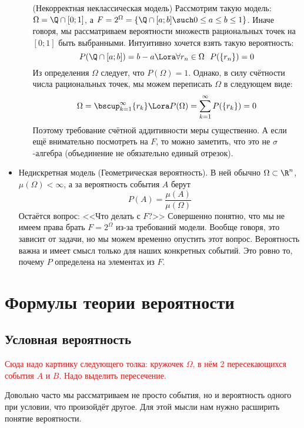 \begin{itemize}
\begin{enumerate}
		\begin{example} (Некорректная неклассическая модель)
			Рассмотрим такую модель: $\Omega = \Q \cap [0; 1]$, а $F = 2^\Omega = \{\Q \cap [a; b] \such 0 \le a \le b \le 1\}$. Иначе говоря, мы рассматриваем вероятности множеств рациональных точек на $[0; 1]$ быть выбранными. Интуитивно хочется взять такую вероятность:
			\[
				P(\Q \cap [a; b]) = b - a \Lora \forall r_n \in \Omega\ \ P(\{r_n\}) = 0
			\]
			Из определения $\Omega$ следует, что $P(\Omega) = 1$. Однако, в силу счётности числа рациональных точек, мы можем переписать $\Omega$ в следующем виде:
			\[
				\Omega = \bscup_{k = 1}^\infty \{r_k\} \Lora P(\Omega) = \sum_{k = 1}^\infty P(\{r_k\}) = 0
			\]
			Поэтому требование счётной аддитивности меры существенно. А если ещё внимательно посмотреть на $F$, то можно заметить, что это не $\sigma$-алгебра (объединение не обязательно единый отрезок).
		\end{example}
	\end{enumerate}

	\item Недискретная модель (Геометрическая вероятность). В ней обычно $\Omega \subset \R^n$, $\mu(\Omega) < \infty$, а за вероятность события $A$ берут
	\[
		P(A) = \frac{\mu(A)}{\mu(\Omega)}
	\]
	Остаётся вопрос: <<Что делать с $F$?>> Совершенно понятно, что мы не имеем права брать $F = 2^\Omega$ из-за требований модели. Вообще говоря, это зависит от задачи, но мы можем временно опустить этот вопрос. Вероятность важна и имеет смысл только для наших конкретных событий. Это ровно то, почему $P$ определена на элементах из $F$.
\end{itemize}

\section{Формулы теории вероятности}

\subsection{Условная вероятность}

\textcolor{red}{Сюда надо картинку следующего толка: кружочек $\Omega$, в нём 2 пересекающихся события $A$ и $B$. Надо выделить пересечение.}

\begin{note}
	Довольно часто мы рассматриваем не просто события, но и вероятность одного при условии, что произойдёт другое. Для этой мысли нам нужно расширить понятие вероятности.
\end{note}

